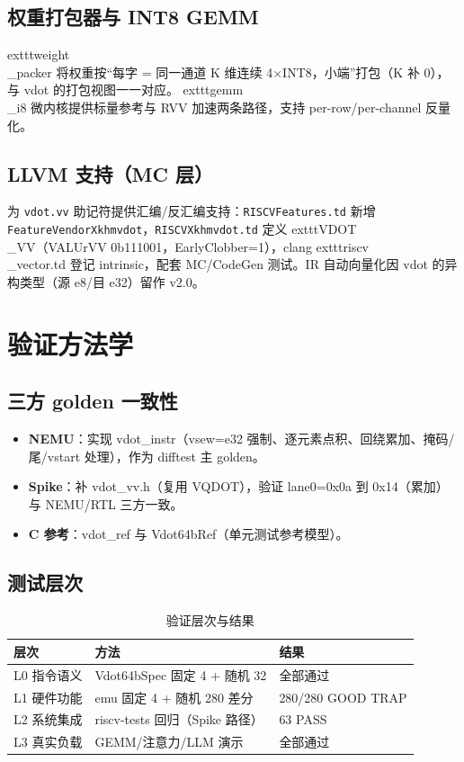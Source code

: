 \documentclass[11pt]{article}
\begin{document}
\subsection{权重打包器与 INT8 GEMM}
	exttt{weight\\_packer} 将权重按“每字 = 同一通道 K 维连续 4$\times$INT8，小端”打包（K 补 0），与 vdot 的打包视图一一对应。	exttt{gemm\\_i8} 微内核提供标量参考与 RVV 加速两条路径，支持 per-row/per-channel 反量化。

\subsection{LLVM 支持（MC 层）}
为 \texttt{vdot.vv} 助记符提供汇编/反汇编支持：\texttt{RISCVFeatures.td} 新增 \texttt{FeatureVendorXkhmvdot}，\texttt{RISCVXkhmvdot.td} 定义 	exttt{VDOT\\_VV}（VALUrVV 0b111001，EarlyClobber=1），clang 	exttt{riscv\\_vector.td} 登记 intrinsic，配套 MC/CodeGen 测试。IR 自动向量化因 vdot 的异构类型（源 e8/目 e32）留作 v2.0。

\section{验证方法学}
\subsection{三方 golden 一致性}
\begin{itemize}
  \item \textbf{NEMU}：实现 vdot\_instr（vsew=e32 强制、逐元素点积、回绕累加、掩码/尾/vstart 处理），作为 difftest 主 golden。
  \item \textbf{Spike}：补 vdot\_vv.h（复用 VQDOT），验证 lane0=0x0a 到 0x14（累加）与 NEMU/RTL 三方一致。
  \item \textbf{C 参考}：vdot\_ref 与 Vdot64bRef（单元测试参考模型）。
\end{itemize}

\subsection{测试层次}
\begin{table}[htbp]
\centering
\caption{验证层次与结果}
\label{tab:verif}
\begin{tabular}{l l l}
\toprule
\textbf{层次} & \textbf{方法} & \textbf{结果} \\
\midrule
L0 指令语义 & Vdot64bSpec 固定 4 + 随机 32 & \textcolor{GreenOK}{全部通过} \\
L1 硬件功能 & emu 固定 4 + 随机 280 差分 & \textcolor{GreenOK}{280/280 GOOD TRAP} \\
L2 系统集成 & riscv-tests 回归（Spike 路径） & \textcolor{GreenOK}{63 PASS} \\
L3 真实负载 & GEMM/注意力/LLM 演示 & \textcolor{GreenOK}{全部通过} \\
\bottomrule
\end{tabular}
\end{table}
\end{document}

